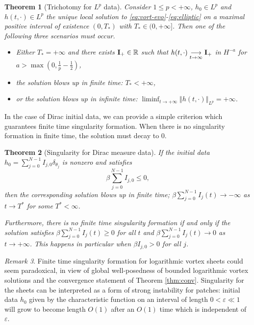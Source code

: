 \documentclass[10pt]{article}
\newtheorem{theorem}{Theorem}[section]
\theoremstyle{definition}
\theoremstyle{remark}
\newtheorem{remark}[theorem]{Remark}
\numberwithin{equation}{section}
\newcommand{\0}{\emptyset}
\newcommand{\bt}{\beta}
\newcommand{\dlt}{\delta}
\newcommand{\tht}{\theta}
\newcommand{\varep}{\varepsilon}
\newcommand{\bfI}{{\bf I}}
\begin{document}
	
	
	\begin{theorem}[Trichotomy for $L^p$ data] \label{thm:tri}
		Consider $1\leq p<+\infty$,  $h_0\in L^p$  and $h(t,\cdot)\in L^p$ the unique local solution to \eqref{eq:vort-evo}-\eqref{eq:elliptic} on a maximal positive interval of existence $(0,T_*)$ with $T_*\in (0,+\infty]$. Then one of the following three scenarios must occur. 
		\begin{itemize}
			\item Either $T_*=+\infty$ and there exists $\bfI_+\in \mathbb{R}$ such that $h(t,\cdot)\underset{t\to \infty}{\longrightarrow} \bfI_+$ in $H^{-a}$ for $a>\max\left(0,\frac{1}{p}-\frac{1}{2}\right)$,
			\item the solution blows up in finite time: $T_*<+\infty$,
			\item or the solution blows up in infinite time: $\liminf_{t\to +\infty}\left\Vert h(t,\cdot)\right\Vert_{L^p}=+\infty$.
		\end{itemize}
	\end{theorem}
	
	
	\medskip
	
	In the case of Dirac initial data, we can provide a simple  criterion which guarantees finite time singularity formation. When there is no singularity formation in finite time, the solution must decay to 0. 
 
	\begin{theorem}[Singularity for Dirac measure data] \label{thm:blowup-Dirac}
		If the initial data $h_0 = \sum_{j=0}^{N-1} I_{j,0} \dlt_{\tht_j}$ is nonzero and satisfies $$\bt \sum_{j=0}^{N-1} I_{j,0} \le 0,$$ then the corresponding solution blows up in finite time; $\bt \sum_{j=0}^{N-1} I_j(t) \to -\infty$ as $t\to T^*$ for some $T^*<\infty$. 

        Furthermore, there is no finite time singularity formation if and only if the solution satisfies $\bt \sum_{j=0}^{N-1} I_j(t) \geq 0$ for all $t$ and $\bt \sum_{j=0}^{N-1} I_j(t) \to 0$ as $t\to +\infty$. This happens in particular when $\bt I_{j,0} > 0$ for all $j$.
	\end{theorem} 
	
	\begin{remark}
		Finite time singularity formation for logarithmic vortex sheets could seem paradoxical, in view of global well-posedness of bounded logarithmic vortex solutions and the convergence statement of Theorem \ref{thm:conv}. Singularity for the sheets can be interpreted as a form of strong instability for patches: initial data $h_{0}$ given by the characteristic function on an interval of length $0<\varep\ll 1$ will grow to become length $O(1)$ after an $O(1)$ time which is independent of $\varep$.
	\end{remark}
\end{document}

